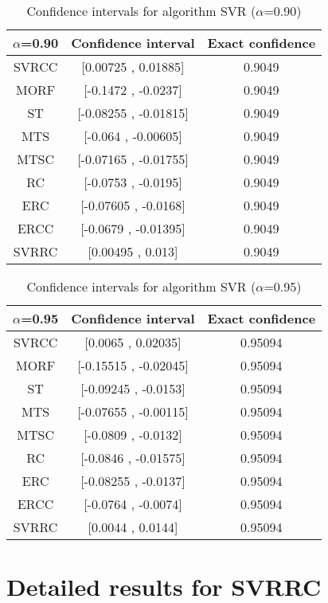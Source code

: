 \documentclass[a4paper,10pt]{article}
\begin{document}
\begin{table}[!htp]
\centering\small
\begin{tabular}{
|c|c|c|}
\hline
 $\alpha$=0.90 & Confidence interval & Exact confidence \\ \hline 
SVRCC & [0.00725 , 0.01885] & 0.9049\\ \hline 
MORF & [-0.1472 , -0.0237] & 0.9049\\ \hline 
ST & [-0.08255 , -0.01815] & 0.9049\\ \hline 
MTS & [-0.064 , -0.00605] & 0.9049\\ \hline 
MTSC & [-0.07165 , -0.01755] & 0.9049\\ \hline 
RC & [-0.0753 , -0.0195] & 0.9049\\ \hline 
ERC & [-0.07605 , -0.0168] & 0.9049\\ \hline 
ERCC & [-0.0679 , -0.01395] & 0.9049\\ \hline 
SVRRC & [0.00495 , 0.013] & 0.9049\\ \hline 

\end{tabular}
\caption{Confidence intervals for algorithm SVR ($\alpha$=0.90)}
\end{table}
\begin{table}[!htp]
\centering\small
\begin{tabular}{
|c|c|c|}
\hline
 $\alpha$=0.95 & Confidence interval & Exact confidence \\ \hline 
SVRCC & [0.0065 , 0.02035] & 0.95094\\ \hline 
MORF & [-0.15515 , -0.02045] & 0.95094\\ \hline 
ST & [-0.09245 , -0.0153] & 0.95094\\ \hline 
MTS & [-0.07655 , -0.00115] & 0.95094\\ \hline 
MTSC & [-0.0809 , -0.0132] & 0.95094\\ \hline 
RC & [-0.0846 , -0.01575] & 0.95094\\ \hline 
ERC & [-0.08255 , -0.0137] & 0.95094\\ \hline 
ERCC & [-0.0764 , -0.0074] & 0.95094\\ \hline 
SVRRC & [0.0044 , 0.0144] & 0.95094\\ \hline 

\end{tabular}
\caption{Confidence intervals for algorithm SVR ($\alpha$=0.95)}
\end{table}

 \clearpage 


\section{Detailed results for SVRRC}
\end{document}
